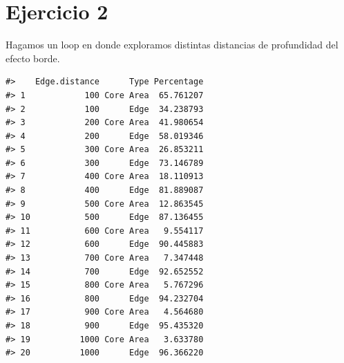 \documentclass[
]{book}
\newenvironment{Shaded}{\begin{snugshade}}{\end{snugshade}}
\newcommand{\AttributeTok}[1]{\textcolor[rgb]{0.13,0.29,0.53}{#1}}
\newcommand{\CommentTok}[1]{\textcolor[rgb]{0.56,0.35,0.01}{\textit{#1}}}
\newcommand{\ConstantTok}[1]{\textcolor[rgb]{0.56,0.35,0.01}{#1}}
\newcommand{\ControlFlowTok}[1]{\textcolor[rgb]{0.13,0.29,0.53}{\textbf{#1}}}
\newcommand{\DecValTok}[1]{\textcolor[rgb]{0.00,0.00,0.81}{#1}}
\newcommand{\FloatTok}[1]{\textcolor[rgb]{0.00,0.00,0.81}{#1}}
\newcommand{\FunctionTok}[1]{\textcolor[rgb]{0.13,0.29,0.53}{\textbf{#1}}}
\newcommand{\NormalTok}[1]{#1}
\newcommand{\OtherTok}[1]{\textcolor[rgb]{0.56,0.35,0.01}{#1}}
\newcommand{\SpecialCharTok}[1]{\textcolor[rgb]{0.81,0.36,0.00}{\textbf{#1}}}
\newcommand{\StringTok}[1]{\textcolor[rgb]{0.31,0.60,0.02}{#1}}
\begin{document}
\section{Ejercicio 2}\label{ejercicio-2}

Hagamos un loop en donde exploramos distintas distancias de profundidad del efecto borde.

\begin{Shaded}
\end{Shaded}

\begin{verbatim}
#>    Edge.distance      Type Percentage
#> 1            100 Core Area  65.761207
#> 2            100      Edge  34.238793
#> 3            200 Core Area  41.980654
#> 4            200      Edge  58.019346
#> 5            300 Core Area  26.853211
#> 6            300      Edge  73.146789
#> 7            400 Core Area  18.110913
#> 8            400      Edge  81.889087
#> 9            500 Core Area  12.863545
#> 10           500      Edge  87.136455
#> 11           600 Core Area   9.554117
#> 12           600      Edge  90.445883
#> 13           700 Core Area   7.347448
#> 14           700      Edge  92.652552
#> 15           800 Core Area   5.767296
#> 16           800      Edge  94.232704
#> 17           900 Core Area   4.564680
#> 18           900      Edge  95.435320
#> 19          1000 Core Area   3.633780
#> 20          1000      Edge  96.366220
\end{verbatim}
\end{document}
